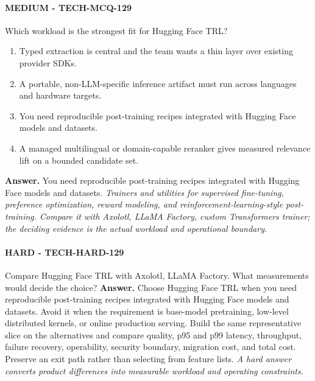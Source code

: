 \paragraph{MEDIUM - TECH-MCQ-129} Which workload is the strongest fit for Hugging Face TRL?
\begin{enumerate}[label=\Alph*.]
\item Typed extraction is central and the team wants a thin layer over existing provider SDKs.
\item A portable, non-LLM-specific inference artifact must run across languages and hardware targets.
\item You need reproducible post-training recipes integrated with Hugging Face models and datasets.
\item A managed multilingual or domain-capable reranker gives measured relevance lift on a bounded candidate set.
\end{enumerate}
\textbf{Answer.} You need reproducible post-training recipes integrated with Hugging Face models and datasets.
\textit{Trainers and utilities for supervised fine-tuning, preference optimization, reward modeling, and reinforcement-learning-style post-training. Compare it with Axolotl, LLaMA Factory, custom Transformers trainer; the deciding evidence is the actual workload and operational boundary.}
\paragraph{HARD - TECH-HARD-129} Compare Hugging Face TRL with Axolotl, LLaMA Factory. What measurements would decide the choice?
\textbf{Answer.} Choose Hugging Face TRL when you need reproducible post-training recipes integrated with Hugging Face models and datasets. Avoid it when the requirement is base-model pretraining, low-level distributed kernels, or online production serving. Build the same representative slice on the alternatives and compare quality, p95 and p99 latency, throughput, failure recovery, operability, security boundary, migration cost, and total cost. Preserve an exit path rather than selecting from feature lists.
\textit{A hard answer converts product differences into measurable workload and operating constraints.}
